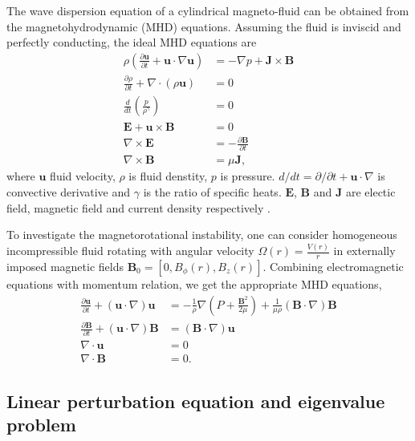 \documentclass{jfm}
\newcommand{\del}{\nabla}
\begin{document}
The wave dispersion equation of a cylindrical magneto-fluid can be obtained 
from the magnetohydrodynamic (MHD) equations. Assuming the fluid is inviscid 
and perfectly conducting, the ideal MHD equations are 
\begin{align}
    \rho\left(\frac{\partial\mathbf{u}}{\partial t}+\mathbf{u}\cdot\del\mathbf{u}\right) &= -\del p +\mathbf{J}\times\mathbf{B} \\
    \frac{\partial \rho}{\partial t} + \del\cdot(\rho \mathbf{u})&=0 \\
    \frac{d}{dt}\left(\frac{p}{\rho^\gamma}\right)&=0\\
    \mathbf{E}+\mathbf{u}\times\mathbf{B}&=0 \\
    \del\times \mathbf{E} &= -\frac{\partial \mathbf{B}}{\partial t} \\
    \del \times \mathbf{B} &= \mu \mathbf{J},
\end{align}
where $\mathbf{u}$ fluid velocity, $\rho$ is fluid denstity, $p$ is pressure. $d/dt=\partial/\partial t +\mathbf{u}\cdot\del$ is convective derivative and $\gamma$ is the ratio of specific heats. $\mathbf{E}$, $\mathbf{B}$ and $\mathbf{J}$ are electic field, magnetic field and current density respectively \cite[see][]{Freidberg1987}.

To investigate the magnetorotational instability, one can consider homogeneous incompressible fluid rotating 
with angular velocity $\Omega(r)=\frac{V(r)}{r}$ in externally imposed magnetic 
fields $\mathbf{B}_0 = [0,B_\phi(r),B_z(r)]$. Combining electromagnetic 
equations with momentum relation, we get the appropriate MHD equations,
\begin{align}
    \frac{\partial \mathbf{u}}{\partial t}+(\mathbf{u}\cdot\del)\mathbf{u} &= -\frac{1}{\rho}\del\left(P+\frac{\mathbf{B}^2}{2\mu}\right)+\frac{1}{\mu\rho}(\mathbf{B}\cdot\del)\mathbf{B}\\
    \frac{\partial \mathbf{B}}{\partial t} +(\mathbf{u}\cdot\del)\mathbf{B} &=(\mathbf{B}\cdot\del)\mathbf{u} \\
    \del\cdot\mathbf{u}&=0\\
    \del \cdot \mathbf{B} &=0.
\end{align}


%
%
\subsection{Linear perturbation equation and eigenvalue problem}
\end{document}
